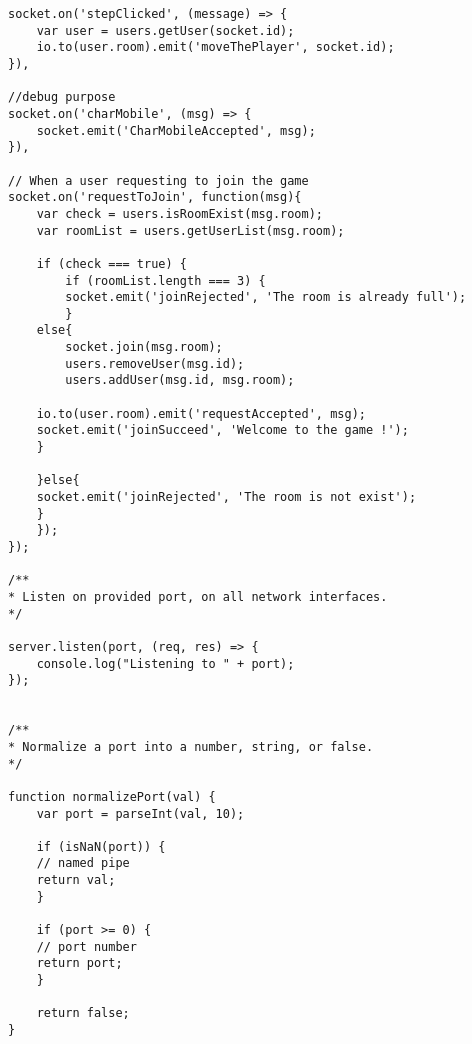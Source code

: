 \begin{lstlisting}
socket.on('stepClicked', (message) => {
	var user = users.getUser(socket.id);
	io.to(user.room).emit('moveThePlayer', socket.id);
}),

//debug purpose
socket.on('charMobile', (msg) => {
	socket.emit('CharMobileAccepted', msg);
}),

// When a user requesting to join the game
socket.on('requestToJoin', function(msg){
	var check = users.isRoomExist(msg.room);
	var roomList = users.getUserList(msg.room);

	if (check === true) {
		if (roomList.length === 3) {
		socket.emit('joinRejected', 'The room is already full');
		}
	else{
		socket.join(msg.room);
		users.removeUser(msg.id);
		users.addUser(msg.id, msg.room);

	io.to(user.room).emit('requestAccepted', msg);
	socket.emit('joinSucceed', 'Welcome to the game !');
	}

	}else{
	socket.emit('joinRejected', 'The room is not exist');
	}
	});
});

/**
* Listen on provided port, on all network interfaces.
*/

server.listen(port, (req, res) => {
	console.log("Listening to " + port);
});


/**
* Normalize a port into a number, string, or false.
*/

function normalizePort(val) {
	var port = parseInt(val, 10);

	if (isNaN(port)) {
	// named pipe
	return val;
	}

	if (port >= 0) {
	// port number
	return port;
	}

	return false;
}

\end{lstlisting}